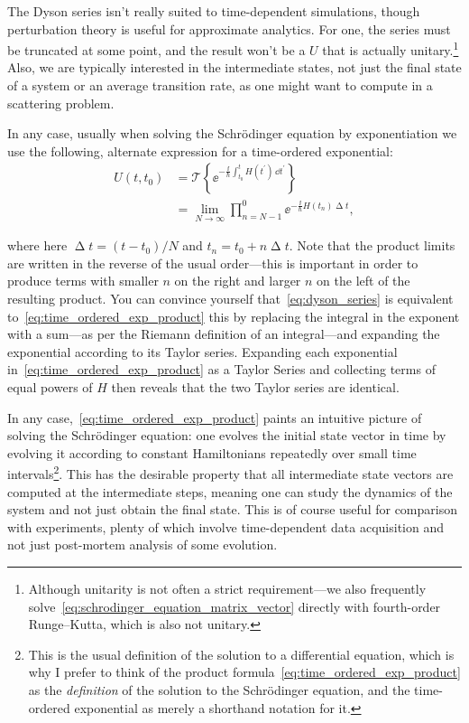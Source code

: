 The Dyson series isn't really suited to time-dependent simulations, though perturbation theory is useful for approximate analytics. For one, the series must be truncated at some point, and the result won't be a $U$ that is actually unitary.\footnote{Although unitarity is not often a strict requirement---we also frequently solve~\eqref{eq:schrodinger_equation_matrix_vector} directly with fourth-order Runge--Kutta, which is also not unitary.} Also, we are typically interested in the intermediate states, not just the final state of a system or an average transition rate, as one might want to compute in a scattering problem.

In any case, usually when solving the Schr\"odinger equation by exponentiation we use the following, alternate expression for a time-ordered exponential:
\begin{align}
U(t, t_0) &= \mathcal{T}\left\{\ee^{-\frac \ii \hbar \int_{t_0}^t H(t^\prime)\,\dd t^\prime}\right\}\\
 &= \lim_{N\rightarrow\infty}\prod_{n=N-1}^0 \ee^{-\frac \ii \hbar  H(t_n)\upDelta t},
\label{eq:time_ordered_exp_product}
\end{align}

where here $\upDelta t = (t - t_0)/N$ and $t_n = t_0 + n\upDelta t$. Note that the product limits are written in the reverse of the usual order---this is important in order to produce terms with smaller $n$ on the right and larger $n$ on the left of the resulting product. You can convince yourself that~\eqref{eq:dyson_series} is equivalent to~\eqref{eq:time_ordered_exp_product} this by replacing the integral in the exponent with a sum---as per the Riemann definition of an integral---and expanding the exponential according to its Taylor series. Expanding each exponential in~\eqref{eq:time_ordered_exp_product} as a Taylor Series and collecting terms of equal powers of $H$ then reveals that the two Taylor series are identical.

In any case,~\eqref{eq:time_ordered_exp_product} paints an intuitive picture of solving the Schr\"odinger equation: one evolves the initial state vector in time by evolving it according to constant Hamiltonians repeatedly over small time intervals\footnote{This is the usual definition of the solution to a differential equation, which is why I prefer to think of the product formula~\eqref{eq:time_ordered_exp_product} as the \emph{definition} of the solution to the Schr\"odinger equation, and the time-ordered exponential as merely a shorthand notation for it.}. This has the desirable property that all intermediate state vectors are computed at the intermediate steps, meaning one can study the dynamics of the system and not just obtain the final state. This is of course useful for comparison with experiments, plenty of which involve time-dependent data acquisition and not just post-mortem analysis of some evolution.

